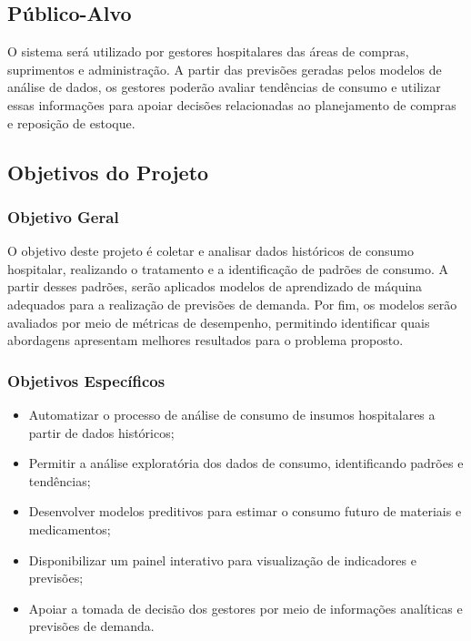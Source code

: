 \documentclass[12pt,a4paper]{article}
\begin{document}

\subsection{Público-Alvo}

O sistema será utilizado por gestores hospitalares das áreas de compras, suprimentos e administração. A partir das previsões geradas pelos modelos de análise de dados, os gestores poderão avaliar tendências de consumo e utilizar essas informações para apoiar decisões relacionadas ao planejamento de compras e reposição de estoque.

\subsection{Objetivos do Projeto}

\subsubsection{Objetivo Geral}

O objetivo deste projeto é coletar e analisar dados históricos de consumo hospitalar, realizando o tratamento e a identificação de padrões de consumo. A partir desses padrões, serão aplicados modelos de aprendizado de máquina adequados para a realização de previsões de demanda. Por fim, os modelos serão avaliados por meio de métricas de desempenho, permitindo identificar quais abordagens apresentam melhores resultados para o problema proposto.

\subsubsection{Objetivos Específicos}

\begin{itemize}
    \item Automatizar o processo de análise de consumo de insumos hospitalares a partir de dados históricos;
    \item Permitir a análise exploratória dos dados de consumo, identificando padrões e tendências;
    \item Desenvolver modelos preditivos para estimar o consumo futuro de materiais e medicamentos;
    \item Disponibilizar um painel interativo para visualização de indicadores e previsões;
    \item Apoiar a tomada de decisão dos gestores por meio de informações analíticas e previsões de demanda.
\end{itemize}
\end{document}
